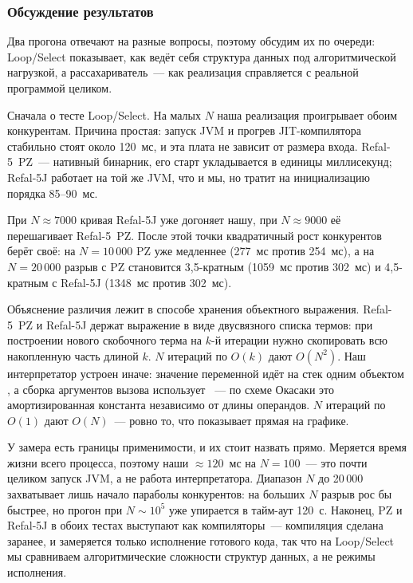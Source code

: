 \subsubsection{Обсуждение результатов}

Два прогона отвечают на разные вопросы, поэтому обсудим их по очереди:
Loop/Select показывает, как ведёт себя структура данных под алгоритмической
нагрузкой, а рассахариватель~--- как реализация справляется с реальной
программой целиком.

Сначала о тесте Loop/Select.
На малых $N$ наша реализация проигрывает обоим конкурентам.
Причина простая: запуск JVM и прогрев JIT-компилятора стабильно стоят
около 120~мс, и эта плата не зависит от размера входа. Refal-5~PZ~---
нативный бинарник, его старт укладывается в единицы миллисекунд;
Refal-5J работает на той же JVM, что и мы, но тратит на инициализацию
порядка 85--90~мс.

При $N \approx 7000$ кривая Refal-5J уже догоняет нашу, при $N \approx 9000$
её перешагивает Refal-5~PZ. После этой точки квадратичный рост
конкурентов берёт своё: на $N = 10\,000$ PZ уже медленнее (277~мс против
254~мс), а на $N = 20\,000$ разрыв с PZ становится 3,5-кратным
(1059~мс против 302~мс) и 4,5-кратным с Refal-5J
(1348~мс против 302~мс).

Объяснение различия лежит в способе хранения объектного выражения.
Refal-5~PZ и Refal-5J держат выражение в виде двусвязного списка
термов: при построении нового скобочного терма 
на $k$-й итерации нужно скопировать всю накопленную часть длиной $k$.
$N$ итераций по $O(k)$ дают $O(N^2)$. Наш интерпретатор устроен иначе:
значение переменной идёт на стек одним объектом ,
а сборка аргументов вызова использует ~--- по схеме
Окасаки это амортизированная константа независимо от длины операндов.
$N$ итераций по $O(1)$ дают $O(N)$~--- ровно то, что показывает прямая
на графике.

У замера есть границы применимости, и их стоит назвать прямо.
Меряется время жизни всего процесса, поэтому наши $\approx 120$~мс на $N = 100$~---
это почти целиком запуск JVM, а не работа интерпретатора. Диапазон $N$ до 20\,000
захватывает лишь начало параболы конкурентов: на больших $N$ разрыв рос бы быстрее, но
прогон при $N \sim 10^5$ уже упирается в тайм-аут 120~с. Наконец, PZ и Refal-5J в обоих
тестах выступают как компиляторы~--- компиляция сделана заранее, и замеряется только
исполнение готового кода, так что на Loop/Select мы сравниваем алгоритмические сложности
структур данных, а не режимы исполнения.

